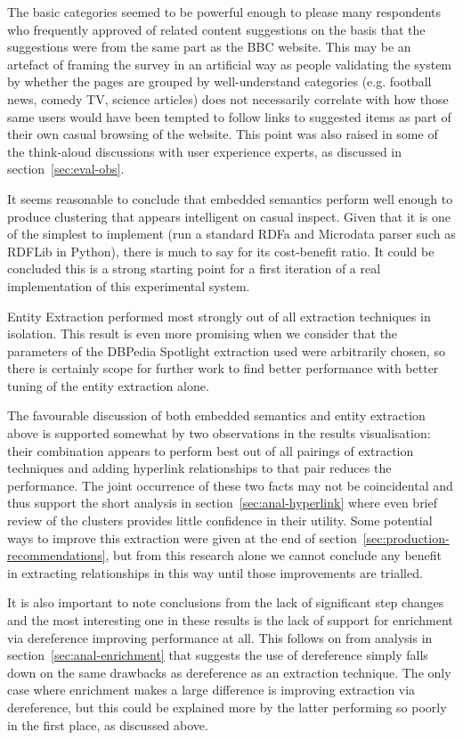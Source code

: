 The basic categories seemed to be powerful enough to please many
respondents who frequently approved of related content suggestions on
the basis that the suggestions were from the same part as the BBC
website. This may be an artefact of framing the survey in an
artificial way as people validating the system by whether the pages
are grouped by well-understand categories (e.g. football news, comedy
TV, science articles) does not necessarily correlate with how those
same users would have been tempted to follow links to suggested items
as part of their own casual browsing of the website. This point
was also raised in some of the think-aloud discussions with user
experience experts, as discussed in section~\ref{sec:eval-obs}.

It seems reasonable to conclude that embedded semantics perform
well enough to produce clustering that appears intelligent on casual
inspect. Given that it is one of the simplest to implement (run
a standard RDFa and Microdata parser such as RDFLib in Python), there
is much to say for its cost-benefit ratio. It could be concluded this
is a strong starting point for a first iteration of a real implementation
of this experimental system.

Entity Extraction performed most strongly out of all extraction
techniques in isolation. This result is even more promising when we
consider that the parameters of the DBPedia Spotlight extraction used
were arbitrarily chosen, so there is certainly scope for further
work to find better performance with better tuning of the entity
extraction alone.

The favourable discussion of both embedded semantics and entity
extraction above is supported somewhat by two observations in the
results visualisation: their combination appears to perform best out
of all pairings of extraction techniques and adding hyperlink
relationships to that pair reduces the performance. The joint
occurrence of these two facts may not be coincidental and thus
support the short analysis in section~\ref{sec:anal-hyperlink} where
even brief review of the clusters provides little confidence in their
utility. Some potential ways to improve this extraction were given
at the end of section~\ref{sec:production-recommendations}, but from
this research alone we cannot conclude any benefit in extracting
relationships in this way until those improvements are trialled.

It is also important to note conclusions from the lack of significant
step changes and the most interesting one in these results is the lack
of support for enrichment via dereference improving performance at
all. This follows on from analysis in section~\ref{sec:anal-enrichment}
that suggests the use of dereference simply falls down on the same
drawbacks as dereference as an extraction technique. The only case
where enrichment makes a large difference is improving extraction via
dereference, but this could be explained more by the latter performing
so poorly in the first place, as discussed above.

